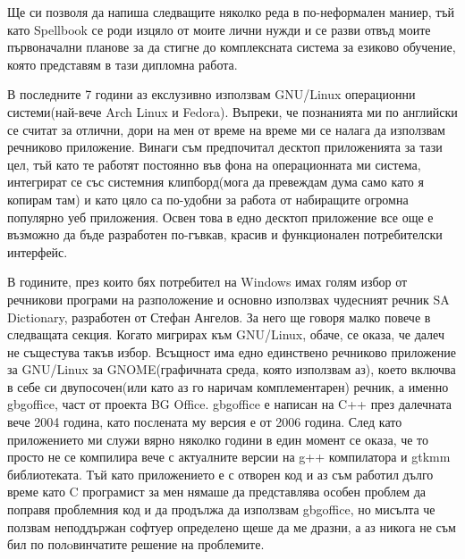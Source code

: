 Ще си позволя да напиша следващите няколко реда в по-неформален
маниер, тъй като Spellbook се роди изцяло от моите лични нужди и се
разви отвъд моите първоначални планове за да стигне до комплексната
система за езиково обучение, която представям в тази дипломна работа.

В последните 7 години аз екслузивно използвам GNU/Linux операционни
системи(най-вече Arch Linux и Fedora). Въпреки, че познанията ми по
английски се считат за отлични, дори на мен от време на време ми се
налага да използвам речниково приложение. Винаги съм предпочитал
десктоп приложенията за тази цел, тъй като те работят постоянно във
фона на операционната ми система, интегрират се със системния
клипборд(мога да превеждам дума само като я копирам там) и като цяло
са по-удобни за работа от набиращите огромна популярно уеб
приложения. Освен това в едно десктоп приложение все още е възможно да
бъде разработен по-гъвкав, красив и функционален потребителски
интерфейс. 

В годините, през които бях потребител на Windows имах голям избор от
речникови програми на разположение и основно използвах чудесният
речник SA Dictionary, разработен от Стефан Ангелов. За него ще говоря
малко повече в следващата секция. Когато мигрирах към GNU/Linux,
обаче, се оказа, че далеч не същестува такъв избор. Всъщност има едно
единствено речниково приложение за GNU/Linux за GNOME(графичната
среда, която използвам аз), което включва в себе си
двупосочен(или като аз го наричам комплементарен) речник, а именно
gbgoffice, част от проекта BG Office. gbgoffice е написан на C++ през
далечната вече 2004 година, като послената му версия е от 2006
година. След като приложението ми служи вярно няколко години в един
момент се оказа, че то просто не се компилира вече с актуалните версии
на g++ компилатора и gtkmm библиотеката. Тъй като приложението е с
отворен код и аз съм работил дълго време като C програмист за мен
нямаше да представлява особен проблем да поправя проблемния код и да
продължа да използвам gbgoffice, но мисълта че ползвам неподдържан
софтуер определено щеше да ме дразни, а аз никога не съм бил по
полoвинчатите решение на проблемите. 

